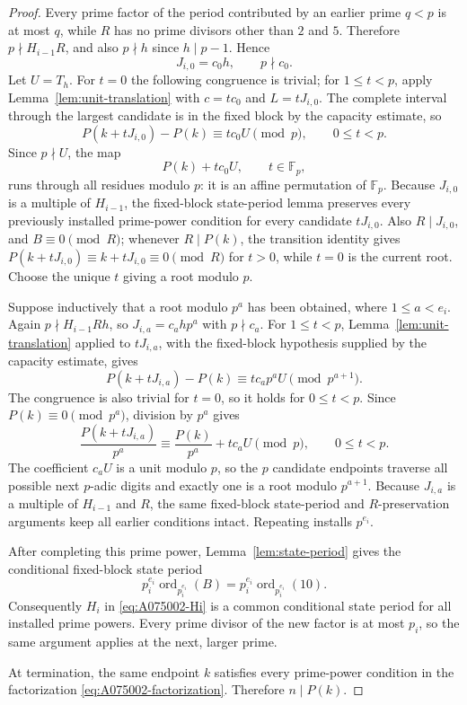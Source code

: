 \documentclass[11pt]{amsart}
\theoremstyle{remark}
\newcommand{\ord}{\operatorname{ord}}
\begin{document}
\begin{proof}
Every prime factor of the period contributed by an earlier prime \(q<p\) is at most \(q\),
while \(R\) has no prime divisors other than \(2\) and \(5\).  Therefore
\(p\nmid H_{i-1}R\), and also \(p\nmid h\) since \(h\mid p-1\).  Hence
\[
J_{i,0}=c_0h,\qquad p\nmid c_0.
\]
Let \(U=T_h\).  For \(t=0\) the following congruence is trivial; for
\(1\le t<p\), apply Lemma~\ref{lem:unit-translation} with \(c=tc_0\) and
\(L=tJ_{i,0}\).  The complete interval through the largest candidate is in the fixed
block by the capacity estimate, so
\begin{equation}\label{eq:A075002-first-sweep}
P(k+tJ_{i,0})-P(k)\equiv tc_0U\pmod p,
\qquad 0\le t<p.
\end{equation}
Since \(p\nmid U\), the map
\[
P(k)+tc_0U,\qquad t\in\mathbb F_p,
\]
runs through all residues modulo \(p\): it is an affine permutation of \(\mathbb F_p\).
Because \(J_{i,0}\) is a multiple of \(H_{i-1}\), the fixed-block state-period lemma
preserves every previously installed prime-power condition for every candidate \(tJ_{i,0}\).
Also \(R\mid J_{i,0}\), and \(B\equiv0\pmod R\); whenever \(R\mid P(k)\), the transition
identity gives \(P(k+tJ_{i,0})\equiv k+tJ_{i,0}\equiv0\pmod R\) for \(t>0\), while
\(t=0\) is the current root.  Choose the unique \(t\) giving a root modulo \(p\).

Suppose inductively that a root modulo \(p^a\) has been obtained, where \(1\le a<e_i\).
Again \(p\nmid H_{i-1}Rh\), so \(J_{i,a}=c_ahp^a\) with \(p\nmid c_a\).  For
\(1\le t<p\), Lemma~\ref{lem:unit-translation} applied to \(tJ_{i,a}\), with the
fixed-block hypothesis supplied by the capacity estimate, gives
\[
P(k+tJ_{i,a})-P(k)\equiv tc_ap^aU\pmod{p^{a+1}}.
\]
The congruence is also trivial for \(t=0\), so it holds for \(0\le t<p\).  Since
\(P(k)\equiv0\pmod{p^a}\), division by \(p^a\) gives
\[
\frac{P(k+tJ_{i,a})}{p^a}
\equiv\frac{P(k)}{p^a}+tc_aU\pmod p,
\qquad 0\le t<p.
\]
The coefficient \(c_aU\) is a unit modulo \(p\), so the \(p\) candidate endpoints
traverse all possible next \(p\)-adic digits and exactly one is a root modulo
\(p^{a+1}\).  Because \(J_{i,a}\) is a multiple of \(H_{i-1}\) and \(R\), the
same fixed-block state-period and \(R\)-preservation arguments keep all earlier
conditions intact.  Repeating installs \(p^{e_i}\).

After completing this prime power, Lemma~\ref{lem:state-period} gives the conditional
fixed-block state period
\[
p_i^{e_i}\ord_{p_i^{e_i}}(B)
 =p_i^{e_i}\ord_{p_i^{e_i}}(10).
\]
Consequently \(H_i\) in \eqref{eq:A075002-Hi} is a common conditional state period for
all installed prime powers.  Every prime divisor of the new factor is at most \(p_i\), so
the same argument applies at the next, larger prime.

At termination, the same endpoint \(k\) satisfies every prime-power condition in the
factorization \eqref{eq:A075002-factorization}.  Therefore \(n\mid P(k)\).
\end{proof}
\end{document}
